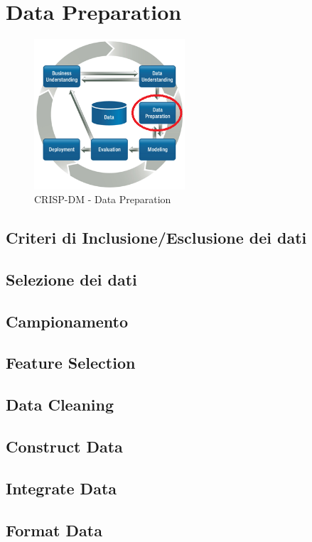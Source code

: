 \chapter{Data Preparation}

\begin{figure}[hbtp]
	\centering
	\includegraphics[width=0.5\textwidth]{./images/CRISPDM_3.png}
	\caption{CRISP-DM - Data Preparation}
	\label{CRISPDM_3}
\end{figure}

\section{Criteri di Inclusione/Esclusione dei dati}

\section{Selezione dei dati}

\section{Campionamento}

\section{Feature Selection}

\section{Data Cleaning}

\section{Construct Data}

\section{Integrate Data}

\section{Format Data}

